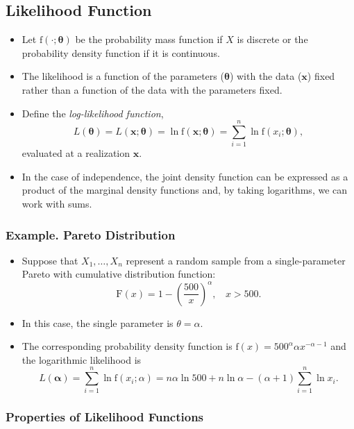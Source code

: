 \documentclass[]{book}
\begin{document}
\subsection{Likelihood Function}\label{likelihood-function}

\begin{itemize}
\item
  Let \(\mathrm{f}(\cdot;\boldsymbol\theta)\) be the probability mass
  function if \(X\) is discrete or the probability density function if
  it is continuous.
\item
  The likelihood is a function of the parameters
  (\(\boldsymbol \theta\)) with the data (\(\mathbf{x}\)) fixed rather
  than a function of the data with the parameters fixed.
\item
  Define the \emph{log-likelihood function},
  \[L(\boldsymbol \theta) = L(\mathbf{x};\boldsymbol \theta ) = \ln \mathrm{f}(\mathbf{x};\boldsymbol \theta) = \sum_{i=1}^n \ln \mathrm{f}(x_i;\boldsymbol \theta),\]
  evaluated at a realization \(\mathbf{x}\).
\item
  In the case of independence, the joint density function can be
  expressed as a product of the marginal density functions and, by
  taking logarithms, we can work with sums.
\end{itemize}

\subsubsection{Example. Pareto
Distribution}\label{example.-pareto-distribution}

\begin{itemize}
\item
  Suppose that \(X_1, \ldots, X_n\) represent a random sample from a
  single-parameter Pareto with cumulative distribution function:
  \[\mathrm{F}(x) = 1- \left(\frac{500}{x}\right)^{\alpha}, ~~~~ x>500 .\]
\item
  In this case, the single parameter is \(\theta = \alpha\).
\item
  The corresponding probability density function is
  \(\mathrm{f}(x) = 500^{\alpha} \alpha x^{-\alpha-1}\) and the
  logarithmic likelihood is
  \[L(\boldsymbol \alpha) = \sum_{i=1}^n \ln \mathrm{f}(x_i;\alpha) = n \alpha \ln 500 +n \ln \alpha -(\alpha+1)  \sum_{i=1}^n \ln x_i .\]
\end{itemize}

\subsubsection{Properties of Likelihood
Functions}\label{properties-of-likelihood-functions}
\end{document}
